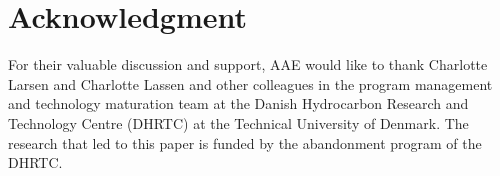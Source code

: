 \documentclass{ECOS_2021}
\begin{document}
\sffamily \section*{Acknowledgment}
\normalsize
For their valuable discussion and support, AAE would like to thank
Charlotte Larsen and Charlotte Lassen and other colleagues in the
program management and technology maturation team at the Danish Hydrocarbon
Research and Technology Centre (DHRTC) at the Technical University
of Denmark. The research that led to this paper is funded by the
abandonment program of the DHRTC.

\sffamily
\normalsize


\end{document}
